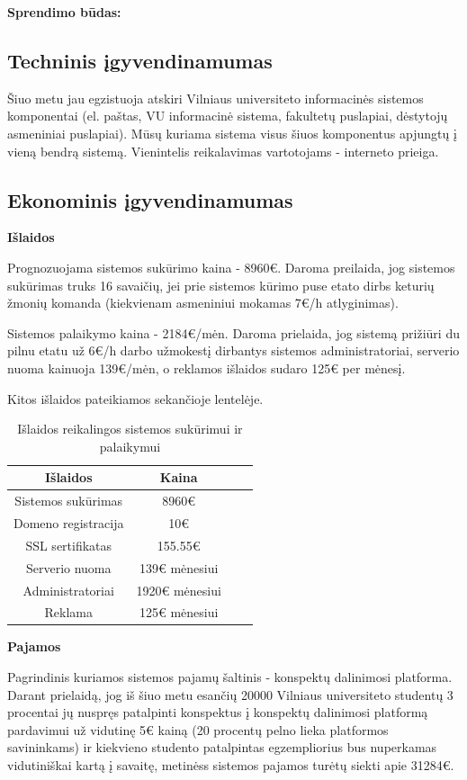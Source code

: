 \documentclass{VUMIFPSkursinis}
\begin{document}
\textbf{Sprendimo būdas:}

\subsection{Techninis įgyvendinamumas}
Šiuo metu jau egzistuoja atskiri Vilniaus universiteto informacinės sistemos komponentai (el. paštas, VU informacinė sistema, fakultetų puslapiai, dėstytojų asmeniniai puslapiai). Mūsų kuriama sistema visus šiuos komponentus apjungtų į vieną bendrą sistemą. Vienintelis reikalavimas vartotojams - interneto prieiga.

\subsection{Ekonominis įgyvendinamumas}

\textbf{Išlaidos}

Prognozuojama sistemos sukūrimo kaina - 8960€. Daroma preilaida, jog sistemos sukūrimas truks 16 savaičių, jei prie sistemos kūrimo puse etato dirbs keturių žmonių komanda (kiekvienam asmeniniui mokamas 7€/h atlyginimas).

Sistemos palaikymo kaina - 2184€/mėn. Daroma prielaida, jog sistemą prižiūri du pilnu etatu už 6€/h darbo užmokestį dirbantys sistemos administratoriai, serverio nuoma kainuoja 139€/mėn, o reklamos išlaidos sudaro 125€ per mėnesį.

Kitos išlaidos pateikiamos sekančioje lentelėje.

\begin{table}[H]
	\centering
	\caption{Išlaidos reikalingos sistemos sukūrimui ir palaikymui}
    {\begin{tabular}{|c|c|c|c|} \hline
			Išlaidos & Kaina  \\
			\hline
			Sistemos sukūrimas & 8960€\\
			\hline
			Domeno registracija & 10€  \\
			\hline
			SSL sertifikatas & 155.55€ \\
			\hline
			Serverio nuoma & 139€ mėnesiui \\
			\hline
			Administratoriai & 1920€ mėnesiui \\
			\hline
			Reklama & 125€ mėnesiui \\
			\hline
	\end{tabular}}
\end{table}

\textbf{Pajamos}

Pagrindinis kuriamos sistemos pajamų šaltinis - konspektų dalinimosi platforma. Darant prielaidą, jog iš šiuo metu esančių 20000 Vilniaus universiteto studentų 3 procentai jų nuspręs patalpinti konspektus į konspektų dalinimosi platformą pardavimui už vidutinę 5€ kainą (20 procentų pelno lieka platformos savininkams) ir kiekvieno studento patalpintas egzempliorius bus nuperkamas vidutiniškai kartą į savaitę, metinėss sistemos pajamos turėtų siekti apie 31284€.
\end{document}
